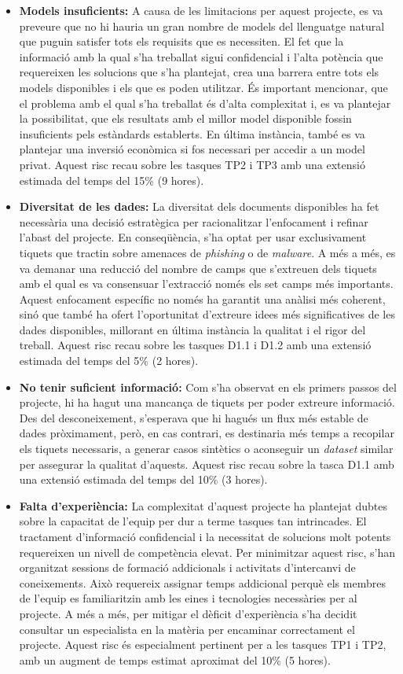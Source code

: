 \begin{itemize}
    \item \textbf{Models insuficients:} A causa de les limitacions per aquest projecte, es va preveure que no hi hauria un gran nombre de models del llenguatge natural que puguin satisfer tots els requisits que es necessiten. El fet que la informació amb la qual s'ha treballat sigui confidencial i l'alta potència que requereixen les solucions que s'ha plantejat, crea una barrera entre tots els models disponibles i els que es poden utilitzar. És important mencionar, que el problema amb el qual s'ha treballat és d'alta complexitat i, es va plantejar la possibilitat, que els resultats amb el millor model disponible fossin insuficients pels estàndards establerts. En última instància, també es va plantejar una inversió econòmica si fos necessari per accedir a un model privat. Aquest risc recau sobre les tasques TP2 i TP3 amb una extensió estimada del temps del 15\% (9 hores).
    \item \textbf{Diversitat de les dades:} La diversitat dels documents disponibles ha fet necessària una decisió estratègica per racionalitzar l'enfocament i refinar l'abast del projecte. En conseqüència, s'ha optat per usar exclusivament tiquets que tractin sobre amenaces de \textit{phishing} o de \textit{malware}. A més a més, es va demanar una reducció del nombre de camps que s'extreuen dels tiquets amb el qual es va consensuar l'extracció només els set camps més importants. Aquest enfocament específic no només ha garantit una anàlisi més coherent, sinó que també ha ofert l'oportunitat d'extreure idees més significatives de les dades disponibles, millorant en última instància la qualitat i el rigor del treball. Aquest risc recau sobre les tasques D1.1 i D1.2 amb una extensió estimada del temps del 5\% (2 hores).
    \item \textbf{No tenir suficient informació:} Com s'ha observat en els primers passos del projecte, hi ha hagut una mancança de tiquets per poder extreure informació. Des del desconeixement, s'esperava que hi hagués un flux més estable de dades pròximament, però, en cas contrari, es destinaria més temps a recopilar els tiquets necessaris, a generar casos sintètics o aconseguir un \textit{dataset} similar per assegurar la qualitat d'aquests. Aquest risc recau sobre la tasca D1.1 amb una extensió estimada del temps del 10\% (3 hores).
    \item \textbf{Falta d'experiència:} La complexitat d'aquest projecte ha plantejat dubtes sobre la capacitat de l'equip per dur a terme tasques tan intrincades. El tractament d'informació confidencial i la necessitat de solucions molt potents requereixen un nivell de competència elevat. Per minimitzar aquest risc, s'han organitzat sessions de formació addicionals i activitats d'intercanvi de coneixements. Això requereix assignar temps addicional perquè els membres de l'equip es familiaritzin amb les eines i tecnologies necessàries per al projecte. A més a més, per mitigar el dèficit d'experiència s'ha decidit consultar un especialista en la matèria per encaminar correctament el projecte. Aquest risc és especialment pertinent per a les tasques TP1 i TP2, amb un augment de temps estimat aproximat del 10\% (5 hores).

\end{itemize}

